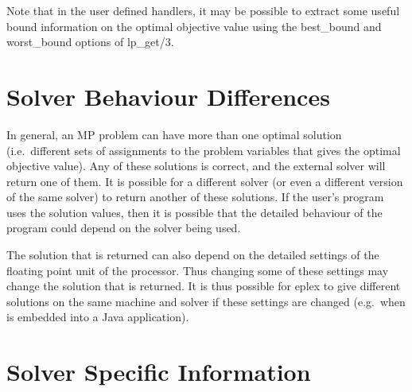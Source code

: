 Note that in the user defined handlers, it may be possible to extract some
useful bound information on the optimal objective value using the
best_bound and worst_bound options of lp_get/3.

\section{Solver Behaviour Differences}
In general, an MP problem can have more than one optimal solution (i.e.\ 
different sets of assignments to the problem variables that gives the
optimal objective value). Any of these solutions is correct, and the
external solver will return one of them. It is possible for a different
solver (or even a different version of the same solver) to return another
of these solutions. If the user's program uses the solution values, then it
is possible that the detailed behaviour of the program could depend on the
solver being used. 

The solution that is returned can also depend on the detailed settings of
the floating point unit of the processor. Thus changing some of these
settings may change the solution that is returned. It is thus possible for
eplex to give different solutions on the same machine and solver if these
settings are changed (e.g.\ when {\eclipse} is embedded into a Java
application). 

\section{Solver Specific Information}
\label{specificsolver}


